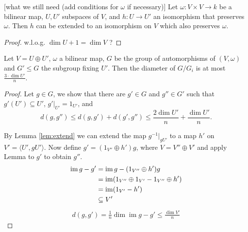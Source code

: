 \begin{lemma}\label{lem:extend}[what we still need (add conditions for $\omega$ if necessary)]
Let $\omega\colon V\times V\to k$ be a bilinear map, $U,U'$ subspaces of $V$, and $h\colon U\to U'$ an isomorphism that preserves $\omega$. Then $h$ can be extended to an isomorphism on $V$ which also preserves $\omega$.
\end{lemma}
\begin{proof}
w.l.o.g. $\dim U+1= \dim V$ ?
\end{proof}


\begin{lemma}
Let $V=U\oplus U'$, $\omega$ a bilinear map, $G$ be the group of automorphisms of $(V,\omega)$ and $G'\leq G$ the subgroup fixing $U'$. Then the diameter of $G/G_i$ is at most $\frac{3\cdot\dim U'}{n}$.
\end{lemma}
\begin{proof}
Let $g\in G$, we show that there are $g'\in G$ and $g''\in G'$ such that $g'(U')\subseteq U'$, $g'|_{U'}=1_{U'}$, and
\[d(g,g'')\leq d(g,g')+d(g',g'')\leq \frac{2\dim U'}{n}+\frac{\dim U'}{n}.\]

By Lemma \ref{lem:extend} we can extend the map $g^{-1}|_{gU'}$ to a map $h'$ on $V'=\langle U',gU' \rangle$. Now define $g'=(1_{V''}\oplus h')g$, where $V=V''\oplus V'$ and apply Lemma to $g'$ to obtain $g''$.
\begin{align*}
\operatorname{im} g-g'&= \operatorname{im} g-(1_{V''}\oplus h')g\\
&=\operatorname{im} (1_{V''}\oplus 1_{V'}-1_{V''}\oplus h')\\
&=\operatorname{im} (1_{V'}-h')\\
&\subseteq V'	
\end{align*}
\begin{align*}
d(g,g')=\frac{1}{n}\dim \operatorname{im} g-g'\leq \frac{\dim V'}{n}
\end{align*}
\end{proof}